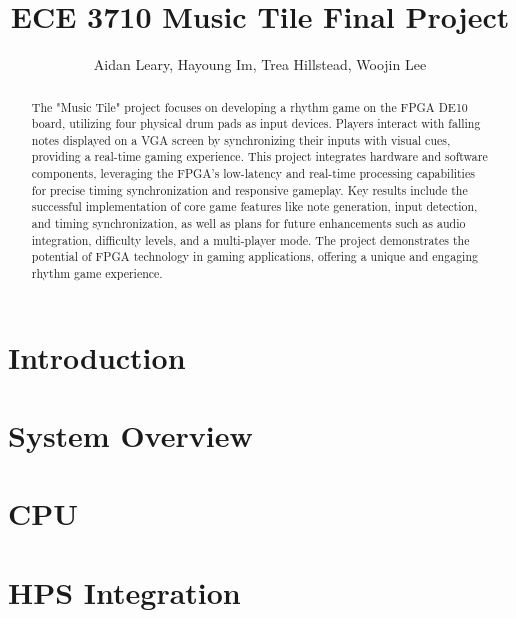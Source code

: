 \documentclass[10pt, letterpaper]{IEEEconf}
\begin{document}
\title{ECE 3710 Music Tile Final Project\\
}

  \author{
  {Aidan Leary, Hayoung Im, Trea Hillstead, Woojin Lee}
  }


  \maketitle

  \begin{abstract}
The "Music Tile" project focuses on developing a rhythm game on the FPGA DE10 board, utilizing four physical drum pads as input devices. Players interact with falling notes displayed on a VGA screen by synchronizing their inputs with visual cues, providing a real-time gaming experience. This project integrates hardware and software components, leveraging the FPGA's low-latency and real-time processing capabilities for precise timing synchronization and responsive gameplay. Key results include the successful implementation of core game features like note generation, input detection, and timing synchronization, as well as plans for future enhancements such as audio integration, difficulty levels, and a multi-player mode. The project demonstrates the potential of FPGA technology in gaming applications, offering a unique and engaging rhythm game experience.
  \end{abstract}


  \section{Introduction} 
  

  \section{System Overview}
  

  \section{CPU}
  

  \section{HPS Integration}
  
\end{document}

